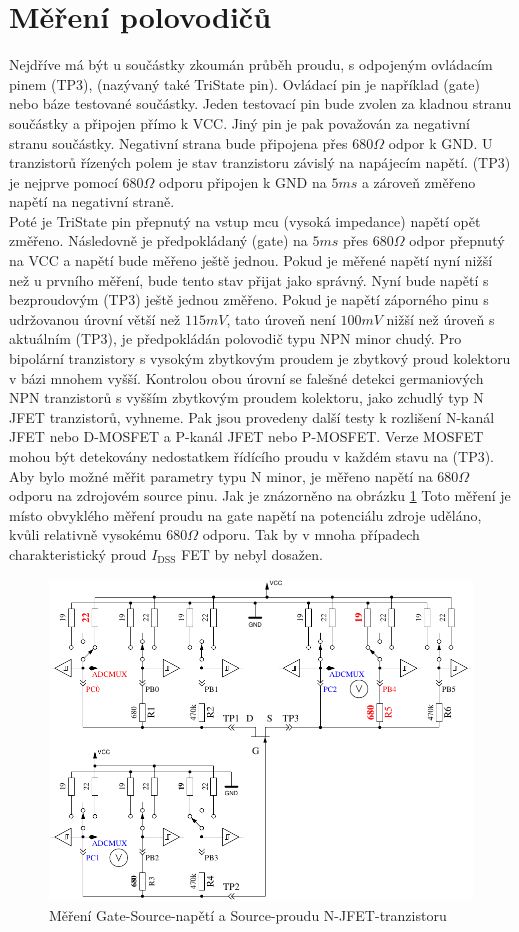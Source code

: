 \section{Měření polovodičů}
Nejdříve má být u součástky zkoumán průběh proudu, s odpojeným ovládacím pinem (TP3),
(nazývaný také TriState pin). Ovládací pin je například (gate) nebo báze testované součástky.
Jeden testovací pin bude zvolen za kladnou stranu součástky a připojen přímo k VCC.
Jiný pin je pak považován za negativní stranu součástky.
Negativní strana bude připojena přes \(680\Omega\) odpor k GND.
U tranzistorů řízených polem je stav tranzistoru závislý na napájecím napětí.
(TP3) je nejprve pomocí \(680\Omega\) odporu připojen  k GND na \(5ms\) a zároveň změřeno napětí na negativní straně.\\Poté je TriState pin  přepnutý na vstup mcu (vysoká impedance) napětí opět změřeno.
Následovně je předpokládaný (gate) na \(5ms\) přes \(680\Omega\) odpor  přepnutý na VCC a napětí bude měřeno ještě jednou.
Pokud je měřené napětí nyní nižší než u prvního měření, bude tento stav přijat jako správný.
Nyní bude napětí s bezproudovým (TP3) ještě jednou změřeno.
Pokud je napětí záporného pinu s udržovanou úrovní větší než \(115mV\), tato úroveň není \(100mV\) nižší než úroveň s aktuálním (TP3), je předpokládán polovodič typu NPN minor chudý.
Pro bipolární tranzistory s vysokým zbytkovým proudem je zbytkový proud kolektoru 
v bázi mnohem vyšší.
Kontrolou obou úrovní se falešné detekci germaniových NPN tranzistorů s vyšším zbytkovým proudem kolektoru,
jako zchudlý typ N JFET tranzistorů, vyhneme.
Pak jsou provedeny další testy k rozlišení N-kanál JFET nebo D-MOSFET a P-kanál JFET nebo P-MOSFET.
Verze MOSFET mohou být detekovány nedostatkem řídícího proudu v každém stavu na (TP3).
Aby bylo možné měřit parametry typu N minor, je měřeno napětí na \(680\Omega\) odporu
na zdrojovém source pinu. Jak je znázorněno na obrázku \ref{fig:JFETcd}
Toto měření je místo obvyklého měření proudu na gate napětí na potenciálu zdroje uděláno,
kvůli relativně vysokému \(680\Omega\) odporu.
Tak by v mnoha případech charakteristický proud \(I_\mathrm{DSS}\) FET by nebyl dosažen.

\begin{figure}[H]
\centering
\includegraphics[width=.8\textwidth]{../FIG/JFETcd.pdf}
\caption{Měření Gate-Source-napětí a Source-proudu N-JFET-tranzistoru}
\label{fig:JFETcd}
\end{figure}

